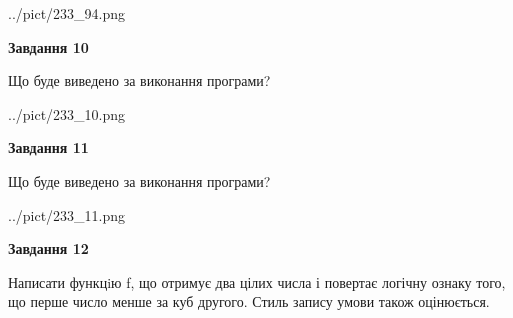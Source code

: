 \documentclass[12pt, ukrainian]{article}
\begin{document}
{\begin {large}
\begin{center}
	{../pict/233_94.png}
\end{center}
\newpage

{\begin {center}\textbf{Завдання 10}\end {center}}

Що буде виведено за виконання програми?\par
\begin{center}
	{../pict/233_10.png}
\end{center}
\newpage

{\begin {center}\textbf{Завдання 11}\end {center}}

Що буде виведено за виконання програми?\par
\begin{center}
	{../pict/233_11.png}
\end{center}
\newpage

{\begin {center}\textbf{Завдання 12}\end {center}}


Написати функцiю f, що отримує два цілих числа і повертає логічну ознаку того, що перше число менше за куб другого. Стиль запису умови також оцінюється.\par
\newpage

\end {large}}
\end{document}
